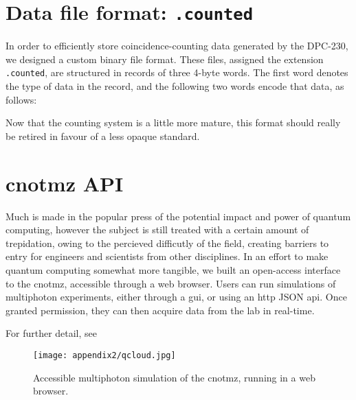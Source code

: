 \section{Data file format: \texttt{.counted}}
In order to efficiently store coincidence-counting data generated by the DPC-230, we designed a custom binary file format. These files, assigned the extension \texttt{.counted}, are structured in records of three 4-byte words. The first word denotes the type of data in the record, and the following two words encode that data, as follows:

Now that the counting system is a little more mature, this format should really be retired in favour of a less opaque standard.

\newpage
\section{\acrshort{cnotmz} API}
Much is made in the popular press of the potential impact and power of quantum computing, however the subject is still treated with a certain amount of trepidation, owing to the percieved difficutly of the field, creating barriers to entry for engineers and scientists from other disciplines. In an effort to make quantum computing somewhat more tangible, we built an open-access interface to the \gls{cnotmz}, accessible through a web browser. Users can run simulations of multiphoton experiments, either through a \gls{gui}, or using an \gls{http} JSON \gls{api}. Once granted permission, they can then acquire data from the lab in real-time.

For further detail, see
\begin{center}
\par
\end{center}

\begin{figure}[b!]
\centering
\texttt{[image: appendix2/qcloud.jpg]}
\caption[Quantum computing in the cloud]{
    Accessible multiphoton simulation of the \gls{cnotmz}, running in a web browser.
}
\label{fig:qcloud}
\end{figure}

